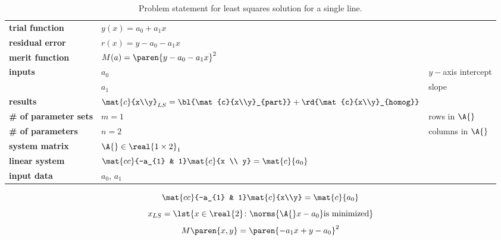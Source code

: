   \begin{table}[h]  %
    \caption{Problem statement for least squares solution for a single line.}
    \begin{center}
      \begin{tabular}{lll}
        \bf{trial function} & $y(x) = a_{0} + a_{1} x$ \\
        \bf{residual error} & $r(x) = y - a_{0} - a_{1} x$ \\
        \bf{merit function} & $M(a) = \paren{y - a_{0} - a_{1} x}^{2}$\\
        \bf{inputs}         & $a_{0}$ & $y-$axis intercept \\
                            & $a_{1}$ & slope \\
        \bf{results}        & $\mat{c}{x\\y}_{LS} = \bl{\mat{c}{x\\y}_{part}} + \rd{\mat{c}{x\\y}_{homog}}$   \\
        \bf{\# of parameter sets} & $m = 1$ & rows in $\A{}$ \\
        \bf{\# of parameters}   & $n = 2$ & columns in $\A{}$ \\
        \bf{system matrix}  & $\A{} \in \real{1 \times 2}_{1}$ \\
        \bf{linear system}  & $\mat{cc}{-a_{1} & 1} 
                               \mat{c}{x \\ y} = 
                               \mat{c}{a_{0}}$ \\
        \bf{input data}     & $a_{0}$, $a_{1}$
      \end{tabular}
    \end{center}
  \label{tab:bevington inputs}
  \end{table}%

  \begin{equation*}   %
      \mat{cc}{-a_{1} & 1} 
      \mat{c}{x\\y} =
      \mat{c}{a_{0}}
  \end{equation*}
  \begin{equation*}   %
      x_{LS} = \lst{x\in\real{2}\colon \norms{\A{}x - a_{0}} \text{is minimized}}
  \end{equation*}
  \begin{equation*}   %
      M\paren{x,y} = \paren{ - a_{1} x + y - a_{0}}^{2}
  \end{equation*}

